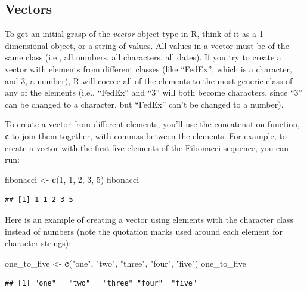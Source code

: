 \documentclass[]{book}
\makeatletter
\newenvironment{Shaded}{\begin{snugshade}}{\end{snugshade}}
\newcommand{\KeywordTok}[1]{\textcolor[rgb]{0.13,0.29,0.53}{\textbf{{#1}}}}
\newcommand{\DecValTok}[1]{\textcolor[rgb]{0.00,0.00,0.81}{{#1}}}
\newcommand{\StringTok}[1]{\textcolor[rgb]{0.31,0.60,0.02}{{#1}}}
\newcommand{\NormalTok}[1]{{#1}}
\newenvironment{kframe}{%
\medskip{}
\setlength{\fboxsep}{.8em}
 \def\at@end@of@kframe{}%
 \ifinner\ifhmode%
  \def\at@end@of@kframe{\end{minipage}}%
  \begin{minipage}{\columnwidth}%
 \fi\fi%
 \def\FrameCommand##1{\hskip\@totalleftmargin \hskip-\fboxsep
 \colorbox{shadecolor}{##1}\hskip-\fboxsep
     \hskip-\linewidth \hskip-\@totalleftmargin \hskip\columnwidth}%
 \MakeFramed {\advance\hsize-\width
   \@totalleftmargin\z@ \linewidth\hsize
   \@setminipage}}%
 {\par\unskip\endMakeFramed%
 \at@end@of@kframe}
\renewenvironment{Shaded}{\begin{kframe}}{\end{kframe}}
\makeatother
\begin{document}
\subsection{Vectors}\label{vectors}

To get an initial grasp of the \emph{vector} object type in R, think of
it as a 1-dimensional object, or a string of values. All values in a
vector must be of the same class (i.e., all numbers, all characters, all
dates). If you try to create a vector with elements from different
classes (like ``FedEx'', which is a character, and 3, a number), R will
coerce all of the elements to the most generic class of any of the
elements (i.e., ``FedEx'' and ``3'' will both become characters, since
``3'' can be changed to a character, but ``FedEx'' can't be changed to a
number).

To create a vector from different elements, you'll use the concatenation
function, \texttt{c} to join them together, with commas between the
elements. For example, to create a vector with the first five elements
of the Fibonacci sequence, you can run:

\begin{Shaded}
\begin{Highlighting}[]
\NormalTok{fibonacci <-}\StringTok{ }\KeywordTok{c}\NormalTok{(}\DecValTok{1}\NormalTok{, }\DecValTok{1}\NormalTok{, }\DecValTok{2}\NormalTok{, }\DecValTok{3}\NormalTok{, }\DecValTok{5}\NormalTok{)}
\NormalTok{fibonacci}
\end{Highlighting}
\end{Shaded}

\begin{verbatim}
## [1] 1 1 2 3 5
\end{verbatim}

Here is an example of creating a vector using elements with the
character class instead of numbers (note the quotation marks used around
each element for character strings):

\begin{Shaded}
\begin{Highlighting}[]
\NormalTok{one_to_five <-}\StringTok{ }\KeywordTok{c}\NormalTok{(}\StringTok{"one"}\NormalTok{, }\StringTok{"two"}\NormalTok{, }\StringTok{"three"}\NormalTok{, }\StringTok{"four"}\NormalTok{, }\StringTok{"five"}\NormalTok{)}
\NormalTok{one_to_five}
\end{Highlighting}
\end{Shaded}

\begin{verbatim}
## [1] "one"   "two"   "three" "four"  "five"
\end{verbatim}
\end{document}
